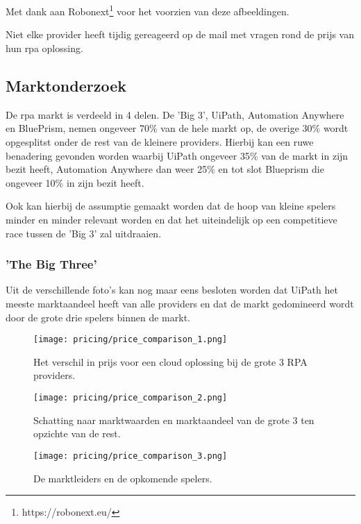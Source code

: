 \chapter{}

Met dank aan Robonext\footnote{https://robonext.eu/} voor het voorzien van deze afbeeldingen.

Niet elke provider heeft tijdig gereageerd op de mail met vragen rond de prijs van hun \acrshort{rpa} oplossing.

\section{Marktonderzoek}
De \acrshort{rpa} markt is verdeeld in 4 delen. De 'Big 3', UiPath, Automation Anywhere en BluePrism, nemen ongeveer 70\% van de hele markt op, de overige 30\% wordt opgesplitst onder de rest van de kleinere providers. Hierbij kan een ruwe benadering gevonden worden waarbij UiPath ongeveer 35\% van de markt in zijn bezit heeft, Automation Anywhere dan weer 25\% en tot slot Blueprism die ongeveer 10\% in zijn bezit heeft. \autocite{marktRPA}

Ook kan hierbij de assumptie gemaakt worden dat de hoop van kleine spelers minder en minder relevant worden en dat het uiteindelijk op een competitieve race tussen de 'Big 3' zal uitdraaien. \autocite{marktRPA}

\subsection{'The Big Three'}
Uit de verschillende foto's kan nog maar eens besloten worden dat UiPath het meeste marktaandeel heeft van alle providers en dat de markt gedomineerd wordt door de grote drie spelers binnen de markt. 
\begin{figure}[h!]
	\texttt{[image: pricing/price\_comparison\_1.png]}
	\caption[Cloud editie benchmarks]{Het verschil in prijs voor een cloud oplossing bij de grote 3 RPA providers.}
	\label{fig:price_1}
\end{figure}
\begin{figure}[h!]
	\texttt{[image: pricing/price\_comparison\_2.png]}
	\caption[Grote 3 Revenue Streams]{Schatting naar marktwaarden en marktaandeel van de grote 3 ten opzichte van de rest.}
	\label{fig:price_2}
\end{figure}
\begin{figure}[h!]
	\texttt{[image: pricing/price\_comparison\_3.png]}
	\caption[Benchmarkings]{De marktleiders en de opkomende spelers.}
	\label{fig:price_3}
\end{figure}

